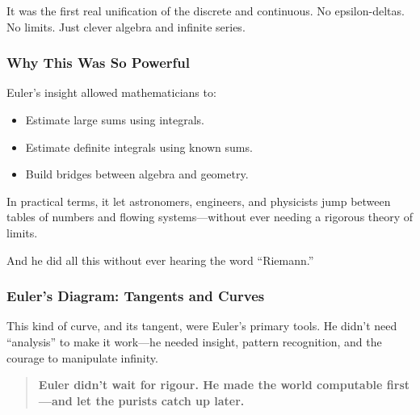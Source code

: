 It was the first real unification of the discrete and continuous. No epsilon-deltas. No limits. Just clever algebra and infinite series.

\subsubsection{Why This Was So Powerful}

Euler’s insight allowed mathematicians to:

\begin{itemize}
  \item Estimate large sums using integrals.
  \item Estimate definite integrals using known sums.
  \item Build bridges between algebra and geometry.
\end{itemize}

In practical terms, it let astronomers, engineers, and physicists jump between tables of numbers and flowing systems—without ever needing a rigorous theory of limits.

And he did all this without ever hearing the word “Riemann.”

\vspace{1em}
\subsubsection{Euler’s Diagram: Tangents and Curves}

\begin{center}
\end{center}

This kind of curve, and its tangent, were Euler’s primary tools. He didn’t need “analysis” to make it work—he needed insight, pattern recognition, and the courage to manipulate infinity.

\begin{quote}
\textbf{Euler didn’t wait for rigour. He made the world computable first—and let the purists catch up later.}
\end{quote}

